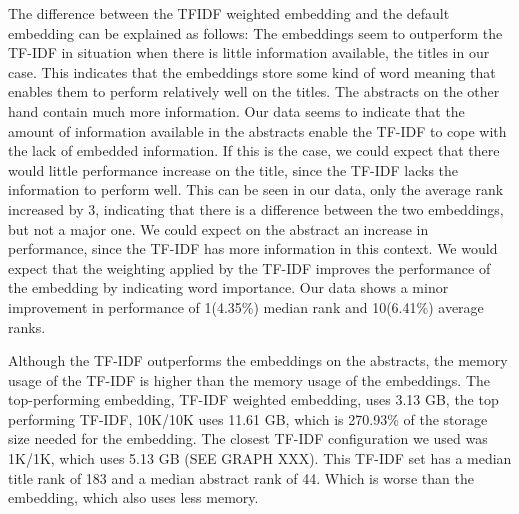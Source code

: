 \documentclass[../../Thesis.tex]{subfiles}
\begin{document}
The difference between the TFIDF weighted embedding and the default embedding can be explained as follows:
The embeddings seem to outperform the TF-IDF in situation when there is little information available, the titles in our case. This indicates that the embeddings store some kind of word meaning that enables them to perform relatively well on the titles. The abstracts on the other hand contain much more information. Our data seems to indicate that the amount of information available in the abstracts enable the TF-IDF to cope with the lack of embedded information. If this is the case, we could expect that there would little performance increase on the title, since the TF-IDF lacks the information to perform well. This can be seen in our data, only the average rank increased by 3, indicating that there is a difference between the two embeddings, but not a major one. We could expect on the abstract an increase in performance, since the TF-IDF has more information in this context. We would expect that the weighting applied by the TF-IDF improves the performance of the embedding by indicating word importance. Our data shows a minor improvement in performance of 1(4.35\%) median rank and 10(6.41\%) average ranks.

Although the TF-IDF outperforms the embeddings on the abstracts, the memory usage of the TF-IDF is higher than the memory usage of the embeddings. The top-performing embedding, TF-IDF weighted embedding, uses 3.13 GB, the top performing TF-IDF, 10K/10K uses 11.61 GB, which is 270.93\% of the storage size needed for the embedding. The closest TF-IDF configuration we used was 1K/1K, which uses 5.13 GB (SEE GRAPH XXX). This TF-IDF set has a median title rank of 183 and a median abstract rank of 44. Which is worse than the embedding, which also uses less memory.
\end{document}
